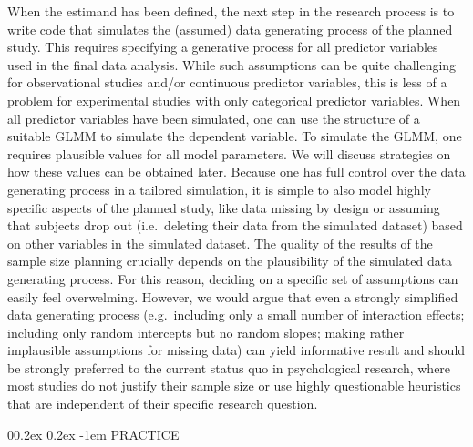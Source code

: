 \documentclass[
  man,floatsintext]{apa6}
\makeatletter
\let\oldparagraph\paragraph
\renewcommand{\paragraph}[1]{\oldparagraph{#1}\mbox{}}
\renewcommand{\paragraph}{\@startsection{paragraph}{4}{\parindent}%
  {0\baselineskip \@plus 0.2ex \@minus 0.2ex}%
  {-1em}%
  {\normalfont\normalsize\bfseries\itshape\typesectitle}}
\makeatother
\begin{document}
When the estimand has been defined, the next step in the research process is to write code that simulates the (assumed) data generating process of the planned study.
This requires specifying a generative process for all predictor variables used in the final data analysis.
While such assumptions can be quite challenging for observational studies and/or continuous predictor variables, this is less of a problem for experimental studies with only categorical predictor variables.
When all predictor variables have been simulated, one can use the structure of a suitable GLMM to simulate the dependent variable.
To simulate the GLMM, one requires plausible values for all model parameters.
We will discuss strategies on how these values can be obtained later.
Because one has full control over the data generating process in a tailored simulation, it is simple to also model highly specific aspects of the planned study, like data missing by design or assuming that subjects drop out (i.e.~deleting their data from the simulated dataset) based on other variables in the simulated dataset.
The quality of the results of the sample size planning crucially depends on the plausibility of the simulated data generating process.
For this reason, deciding on a specific set of assumptions can easily feel overwelming.
However, we would argue that even a strongly simplified data generating process (e.g.~including only a small number of interaction effects; including only random intercepts but no random slopes; making rather implausible assumptions for missing data) can yield informative result and should be strongly preferred to the current status quo in psychological research, where most studies do not justify their sample size or use highly questionable heuristics that are independent of their specific research question.

\hypertarget{practice-1}{%
\paragraph{PRACTICE}\label{practice-1}}
\end{document}
